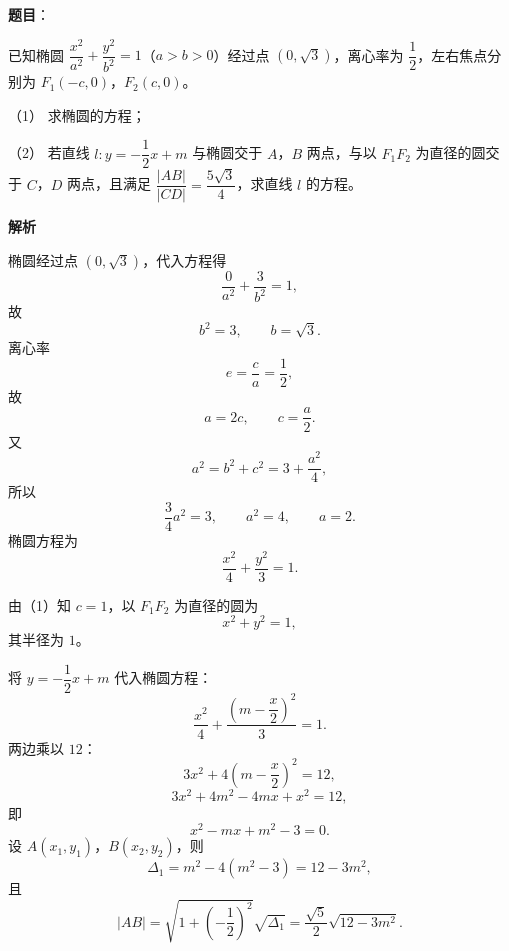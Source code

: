 \begin{answer}

\textbf{题目}：

已知椭圆 $\dfrac{x^2}{a^2}+\dfrac{y^2}{b^2}=1$（$a>b>0$）经过点 $\left(0,\sqrt3\right)$，离心率为 $\dfrac12$，左右焦点分别为 $F_1(-c,0)$，$F_2(c,0)$。
\nopagebreak[4]
\begin{center}\end{center}
\nopagebreak[4]
（1） 求椭圆的方程；

（2） 若直线 $l:y=-\dfrac12x+m$ 与椭圆交于 $A$，$B$ 两点，与以 $F_1F_2$ 为直径的圆交于 $C$，$D$ 两点，且满足 $\dfrac{|AB|}{|CD|}=\dfrac{5\sqrt3}{4}$，求直线 $l$ 的方程。

\textbf{解析}


椭圆经过点 $\left(0,\sqrt3\right)$，代入方程得
\nopagebreak[4]
\[\frac{0}{a^2}+\frac{3}{b^2}=1,\]
故
\nopagebreak[4]
\[b^2=3,\qquad b=\sqrt3.\]
离心率
\nopagebreak[4]
\[e=\frac ca=\frac12,\]
故
\nopagebreak[4]
\[a=2c,\qquad c=\frac a2.\]
又
\nopagebreak[4]
\[a^2=b^2+c^2=3+\frac{a^2}{4},\]
所以
\nopagebreak[4]
\[\frac34a^2=3,\qquad a^2=4,\qquad a=2.\]
椭圆方程为
\nopagebreak[4]
\[\frac{x^2}{4}+\frac{y^2}{3}=1.\]


由（1）知 $c=1$，以 $F_1F_2$ 为直径的圆为
\nopagebreak[4]
\[x^2+y^2=1,\]
其半径为 $1$。

将 $y=-\dfrac12x+m$ 代入椭圆方程：
\nopagebreak[4]
\[\frac{x^2}{4}+\frac{\left(m-\dfrac x2\right)^2}{3}=1.\]
两边乘以 $12$：
\nopagebreak[4]
\[3x^2+4\left(m-\frac x2\right)^2=12,\]
\nopagebreak[4]
\[3x^2+4m^2-4mx+x^2=12,\]
即
\nopagebreak[4]
\[x^2-mx+m^2-3=0.\]
设 $A(x_1,y_1)$，$B(x_2,y_2)$，则
\nopagebreak[4]
\[\Delta_1=m^2-4(m^2-3)=12-3m^2,\]
且
\nopagebreak[4]
\[|AB|=\sqrt{1+\left(-\frac12\right)^2}\sqrt{\Delta_1}
=\frac{\sqrt5}{2}\sqrt{12-3m^2}.\]


\end{answer}
